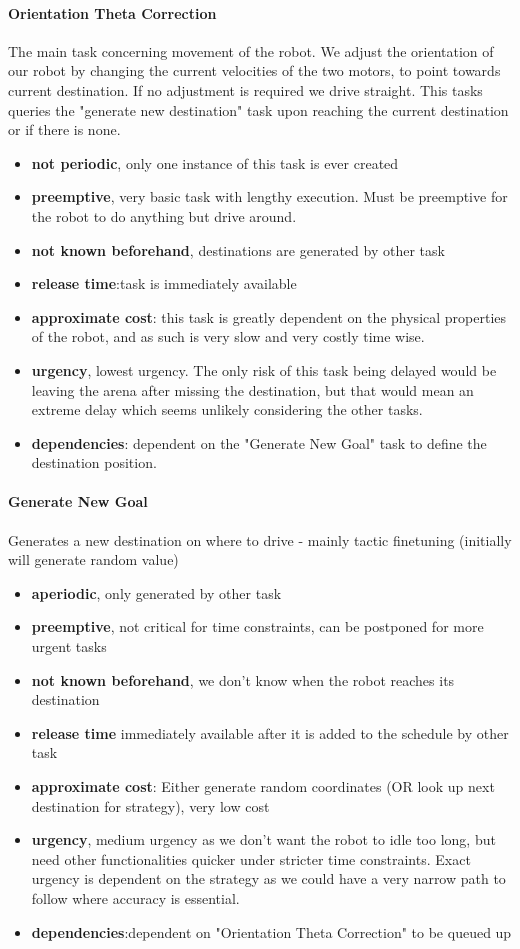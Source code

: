 \documentclass[12pt]{article}
\begin{document}
\paragraph{Orientation Theta Correction}
The main task concerning movement of the robot. We adjust the orientation of our robot by changing the current velocities of the two motors, to point towards current destination. If no adjustment is required we drive straight. This tasks queries the "generate new destination" task upon reaching the current destination or if there is none.
\begin{itemize}
	\item \textbf{not periodic}, only one instance of this task is ever created
	\item \textbf{preemptive}, very basic task with lengthy execution. Must be preemptive for the robot to do anything but drive around. 
	\item \textbf{not known beforehand}, destinations are generated by other task
	\item \textbf{release time}:task is immediately available 
	\item \textbf{approximate cost}: this task is greatly dependent on the physical properties of the robot, and as such is very slow and very costly time wise. 
	\item \textbf{urgency}, lowest urgency. The only risk of this task being delayed would be leaving the arena after missing the destination, but that would mean an extreme delay which seems unlikely considering the other tasks.
	\item \textbf{dependencies}: dependent on the "Generate New Goal" task to define the destination position.
\end{itemize}

\paragraph{Generate New Goal}
Generates a new destination on where to drive - mainly tactic finetuning (initially will generate random value)
\begin{itemize}
	\item \textbf{aperiodic}, only generated by other task
	\item \textbf{preemptive}, not critical for time constraints, can be postponed for more urgent tasks
	\item \textbf{not known beforehand}, we don't know when the robot reaches its destination
	\item \textbf{release time} immediately available after it is added to the schedule by other task
	\item \textbf{approximate cost}: Either generate random coordinates (OR look up next destination for strategy), very low cost
	\item \textbf{urgency}, medium urgency as we don't want the robot to idle too long, but need other functionalities quicker under stricter time constraints. Exact urgency is dependent on the strategy as we could have a very narrow path to follow where accuracy is essential.
	\item \textbf{dependencies}:dependent on "Orientation Theta Correction" to be queued up
\end{itemize}
\end{document}
